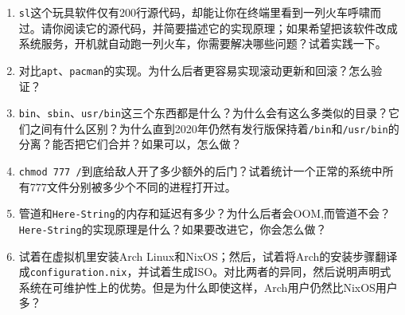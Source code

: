 \documentclass[../main.tex]{subfiles}
\begin{document}
\begin{thinking}
  \begin{enumerate}
    \item \texttt{sl}这个玩具软件仅有200行源代码，却能让你在终端里看到一列火车呼啸而过。请你阅读它的源代码，并简要描述它的实现原理；如果希望把该软件改成系统服务，开机就自动跑一列火车，你需要解决哪些问题？试着实践一下。
    \item 对比\texttt{apt}、\texttt{pacman}的实现。为什么后者更容易实现滚动更新和回滚？怎么验证？
    \item \texttt{bin}、\texttt{sbin}、\texttt{usr/bin}这三个东西都是什么？为什么会有这么多类似的目录？它们之间有什么区别？为什么直到2020年仍然有发行版保持着\texttt{/bin}和\texttt{/usr/bin}的分离？能否把它们合并？如果可以，怎么做？
    \item \texttt{chmod 777 /}到底给敌人开了多少额外的后门？试着统计一个正常的系统中所有777文件分别被多少个不同的进程打开过。
    \item 管道和\texttt{Here-String}的内存和延迟有多少？为什么后者会OOM,而管道不会？\texttt{Here-String}的实现原理是什么？如果要改进它，你会怎么做？
    \item 试着在虚拟机里安装Arch Linux和NixOS；然后，试着将Arch的安装步骤翻译成\texttt{configuration.nix}，并试着生成ISO。对比两者的异同，然后说明声明式系统在可维护性上的优势。但是为什么即使这样，Arch用户仍然比NixOS用户多？
  \end{enumerate}
\end{thinking}
\end{document}
